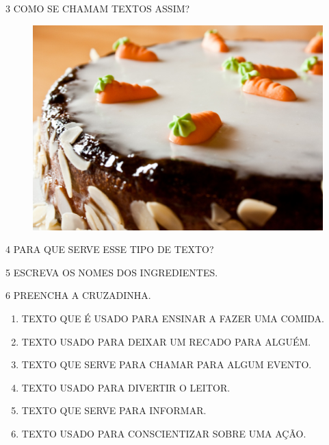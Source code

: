 \num{3} COMO SE CHAMAM TEXTOS ASSIM?


\begin{figure}[H]
\includegraphics[width=\textwidth]{media/image264.png}
\end{figure}

\num{4} PARA QUE SERVE ESSE TIPO DE TEXTO?


\num{5} ESCREVA OS NOMES DOS INGREDIENTES.




\num{6} PREENCHA A CRUZADINHA. 

\begin{enumerate}[itemsep=-5pt]
	\item TEXTO QUE É USADO PARA ENSINAR A FAZER UMA COMIDA.
	\item TEXTO USADO PARA DEIXAR UM RECADO PARA ALGUÉM.
	\item TEXTO QUE SERVE PARA CHAMAR PARA ALGUM EVENTO.
	\item TEXTO USADO PARA DIVERTIR O LEITOR.
	\item TEXTO QUE SERVE PARA INFORMAR.
	\item TEXTO USADO PARA CONSCIENTIZAR SOBRE UMA AÇÃO.
\end{enumerate}



